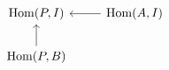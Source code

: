 \documentclass[12pt]{standalone}
\begin{document}
        $$

\begin{tikzcd}
\operatorname{Hom}(P,I) & \operatorname{Hom}(A,I) \ar[l] \\
\operatorname{Hom}(P,B) \ar[u] & 
\end{tikzcd}
        $$
        
\end{document}

